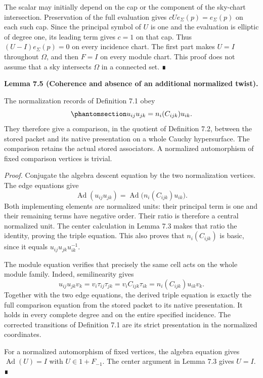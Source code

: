 \documentclass[
  english,
  11pt,
  reqno]{amsart}
\makeatletter
\newcommand{\pandocstatementheading}[1]{%
  \par\if@nobreak\else
    \addpenalty{\@beginparpenalty}%
    \addvspace{.5\baselineskip plus .2\baselineskip minus .2\baselineskip}%
  \fi
  {\normalfont\bfseries #1\par}%
  \nobreak\@afterindenttrue\@afterheading
}
\makeatother
\begin{document}
The scalar may initially depend on the cap or the component of the
sky-chart intersection. Preservation of the full evaluation gives
\(cUe_\Sigma(p)=e_\Sigma(p)\) on each such cap. Since the principal
symbol of \(U\) is one and the evaluation is elliptic of degree one, its
leading term gives \(c=1\) on that cap. Thus \((U-I)e_\Sigma(p)=0\) on
every incidence chart. The first part makes \(U=I\) throughout
\(\Omega\), and then \(F=I\) on every module chart. This proof does not
assume that a sky intersects \(\Omega\) in a connected set. ∎

\pandocstatementheading{\protect{}\label{lem:global-normalization-coherence}Lemma 7.5 (Coherence and absence of an additional normalized twist).}

The normalization records of Definition 7.1 obey
\begin{equation}\protect\phantomsection\label{eq:global-normalization-triple-identity}{
u_{ij}u_{jk}=n_i(C_{ijk})u_{ik}.
}\end{equation} They therefore give a comparison, in the quotient of
Definition 7.2, between the stored packet and its native presentation on
a whole Cauchy hypersurface. The comparison retains the actual stored
associators. A normalized automorphism of fixed comparison vertices is
trivial.

\emph{Proof.} Conjugate the algebra descent equation by the two
normalization vertices. The edge equations give \[
\operatorname{Ad}(u_{ij}u_{jk})
=\operatorname{Ad}\bigl(n_i(C_{ijk})u_{ik}\bigr).
\] Both implementing elements are normalized units: their principal term
is one and their remaining terms have negative order. Their ratio is
therefore a central normalized unit. The center calculation in Lemma 7.3
makes that ratio the identity, proving the triple equation. This also
proves that \(n_i(C_{ijk})\) is basic, since it equals
\(u_{ij}u_{jk}u_{ik}^{-1}\).

The module equation verifies that precisely the same cell acts on the
whole module family. Indeed, semilinearity gives \[
u_{ij}u_{jk}v_k
 =v_i\tau_{ij}\tau_{jk}
 =v_i C_{ijk}\tau_{ik}
 =n_i(C_{ijk})u_{ik}v_k.
\] Together with the two edge equations, the derived triple equation is
exactly the full comparison equation from the stored packet to its
native presentation. It holds in every complete degree and on the entire
specified incidence. The corrected transitions of Definition 7.1 are its
strict presentation in the normalized coordinates.

For a normalized automorphism of fixed vertices, the algebra equation
gives \(\operatorname{Ad}(U)=I\) with \(U\in1+F_{-1}\). The center
argument in Lemma 7.3 gives \(U=I\). ∎
\end{document}
